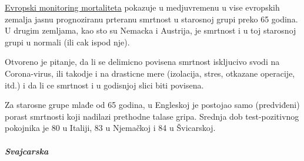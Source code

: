 \href{https://www.euromomo.eu/outputs/zscore_country_total.html}{Evropski
monitoring mortaliteta} pokazuje u medjuvremenu u vise evropskih zemalja
jasnu prognoziranu prteranu smrtnost u starosnoj grupi preko 65 godina.
U drugim zemljama, kao sto su Nemacka i Austrija, je smrtnost i u toj
starosnoj grupi u normali (ili cak ispod nje).

Otvoreno je pitanje, da li se delimicno povisena smrtnost iskljucivo
svodi na Corona-virus, ili takodje i na drasticne mere (izolacija,
stres, otkazane operacije, itd.) i da li ce smrtnost i u godisnjoj slici
biti povisena.

Za starosne grupe mlađe od 65 godina, u Engleskoj je postojao samo
(predviđeni) porast smrtnosti koji nadilazi prethodne talase gripa.
Srednja dob test-pozitivnog pokojnika je 80 u Italiji, 83 u Njemačkoj i
84 u Švicarskoj.

\hypertarget{svajcarska}{%
\subparagraph{\texorpdfstring{\textbf{Svajcarska}}{Svajcarska}}\label{svajcarska}}

